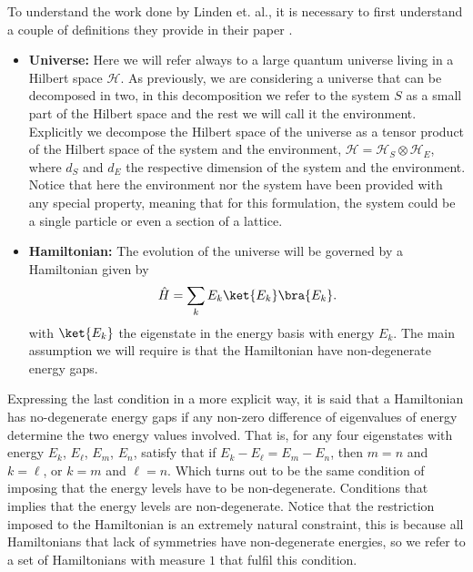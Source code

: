 \indent To understand the work done by Linden et. al., it is necessary to first understand a couple of definitions they provide in their paper  \cite{linden_quantum_2009}.
\begin{itemize}
\item \textbf{Universe:} Here we will refer always to a large quantum universe living in a Hilbert space $\mathcal{H}$. As previously, we are considering a universe that can be decomposed in two, in this decomposition we refer to the system $S$ as a small part of the Hilbert space and the rest we will call it the environment. Explicitly we decompose the Hilbert space of the universe as a tensor product of the Hilbert space of the system and the environment, $\mathcal{H}=\mathcal{H}_S\otimes \mathcal{H}_E$, where $d_S$ and $d_E$ the respective dimension of the system and the environment. Notice that here the environment nor the system have been provided with any special property, meaning that for this formulation, the system could be a single particle or even a section of a lattice.
\item \textbf{Hamiltonian:} The evolution of the universe will be governed by a Hamiltonian given by
\begin{equation}
\hat{H}=\sum_{k}E_k\ket{E_k}\bra{E_k}.
\label{CH1:Hamiltonian_universe_linden}
\end{equation}
with $\ket{E_k}$ the eigenstate in the energy basis with energy $E_k$. The main assumption we will require is that the Hamiltonian have non-degenerate energy gaps.
\end{itemize}

Expressing the last condition in a more  explicit way, it is said that a Hamiltonian has no-degenerate energy gaps if any non-zero difference of eigenvalues of energy determine the two energy values involved. That is, for any four eigenstates with energy $E_k$, $E_\ell$, $E_m$, $E_n$, satisfy that if $E_{k}-E_{\ell}=E_{m}-E_{n}$, then $m=n$ and $k=\ell$, or $k=m$ and $\ell = n$. Which turns out to be the same condition of imposing that the energy levels have to be non-degenerate. Conditions that implies that the energy levels are non-degenerate. Notice that the restriction imposed to the Hamiltonian is an extremely natural constraint, this is because all Hamiltonians that lack of symmetries have non-degenerate energies, so we refer to a set of Hamiltonians with measure $1$ that fulfil this condition.\\

